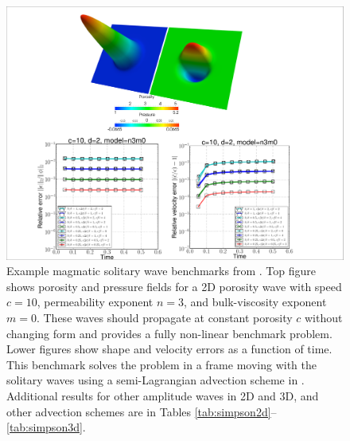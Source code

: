 \begin{figure}[hb]
  \centering
\includegraphics[width=.7\textwidth,clip=true]{figures/simpson_benchmark}
  \caption{Example magmatic solitary wave benchmarks from
    \cite{simpson_solitary_2011}. Top figure shows porosity and
    pressure fields for a 2D porosity wave with speed $c=10$,
    permeability exponent $n=3$, and bulk-viscosity exponent $m=0$.  These waves should propagate at constant porosity $c$
    without changing form and provides a fully non-linear benchmark
    problem. Lower figures show shape and velocity errors as a
    function of time. This benchmark solves the problem in a frame
    moving with the solitary waves using a semi-Lagrangian advection
    scheme in \TF{}. Additional results for other amplitude waves in
    2D and 3D, and other advection schemes are in Tables \ref{tab:simpson2d}--\ref{tab:simpson3d}.  }
  \label{fig:simpson_benchmarks}
\end{figure}

